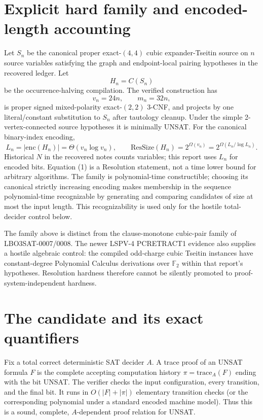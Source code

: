 \documentclass[11pt]{article}
\newcommand{\ResSize}{\mathrm{ResSize}}
\begin{document}
\section{Explicit hard family and encoded-length accounting}
Let $S_n$ be the canonical proper exact-$(4,4)$ cubic expander-Tseitin source
on $n$ source variables satisfying the graph and endpoint-local pairing
hypotheses in the recovered ledger.  Let
\[
                 H_n=C(S_n)
\]
be the occurrence-halving compilation.  The verified construction has
\[
 v_n=24n,\qquad m_n=32n,
\]
is proper signed mixed-polarity exact-$(2,2)$ 3-CNF, and projects by one
literal/constant substitution to $S_n$ after tautology cleanup.  Under the
simple 2-vertex-connected source hypotheses it is minimally UNSAT.  For the
canonical binary-index encoding,
\[
 L_n=|\mathrm{enc}(H_n)|=\Theta(v_n\log v_n),\qquad
 \ResSize(H_n)=2^{\Omega(v_n)}=2^{\Omega(L_n/\log L_n)}.       \tag{1}
\]
Historical $N$ in the recovered notes counts variables; this report uses
$L_n$ for encoded bits.  Equation (1) is a Resolution statement, not a time
lower bound for arbitrary algorithms.  The family is polynomial-time
constructible; choosing its canonical strictly increasing encoding makes
membership in the sequence polynomial-time recognizable by generating and
comparing candidates of size at most the input length.  This recognizability
is used only for the hostile total-decider control below.

The family above is distinct from the clause-monotone cubic-pair family of
LBO3SAT-0007/0008.  The newer LSPV-4 PCRETRACT1 evidence also supplies a
hostile algebraic control: the compiled odd-charge cubic Tseitin instances
have constant-degree Polynomial Calculus derivations over $\mathbb F_2$
within that report's hypotheses.  Resolution hardness therefore cannot be
silently promoted to proof-system-independent hardness.

\section{The candidate and its exact quantifiers}
Fix a total correct deterministic SAT decider $A$.  A trace proof of an UNSAT
formula $F$ is the complete accepting computation history
$\pi=\mathrm{trace}_A(F)$ ending with the bit UNSAT.  The verifier checks the
input configuration, every transition, and the final bit.  It runs in
$O(|F|+|\pi|)$ elementary transition checks (or the corresponding polynomial
under a standard encoded machine model).  Thus this is a sound, complete,
$A$-dependent proof relation for UNSAT.
\end{document}
